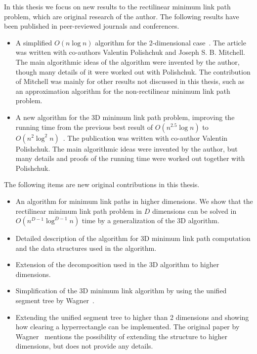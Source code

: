 \documentclass[english,gradu]{tktltiki2018}
\begin{document}
In this thesis we focus on new results to the rectilinear minimum link path problem, which are original research of the author.
The following results have been published in peer-reviewed journals and conferences.
\begin{itemize}
\item A simplified $O(n\log n)$ algorithm for the 2-dimensional case~\cite{revisited}.
The article was written with co-authors Valentin Polishchuk and Joseph S. B. Mitchell.
The main algorithmic ideas of the algorithm were invented by the author, though many details of it were worked out with Polishchuk.
The contribution of Mitchell was mainly for other results not discussed in this thesis, such as an approximation algorithm for the non-rectilinear minimum link path problem.
\item A new algorithm for the 3D minimum link path problem, improving the running time from the previous best result of $O(n^{2.5}\log n)$ to $O(n^2\log^2 n)$~\cite{restricted}.
The publication was written with co-author Valentin Polishchuk.
The main algorithmic ideas were invented by the author, but many details and proofs of the running time were worked out together with Polishchuk.
\end{itemize}

The following items are new original contributions in this thesis.

\begin{itemize}
\item An algorithm for minimum link paths in higher dimensions.
	We show that the rectilinear minimum link path problem in $D$ dimensions can be solved in $O(n^{D-1}\log^{D-1} n)$ time by a generalization of the 3D algorithm.
\item Detailed description of the algorithm for 3D minimum link path computation and the data structures used in the algorithm.
\item Extension of the decomposition used in the 3D algorithm to higher dimensions.
\item Simplification of the 3D minimum link algorithm by using the unified segment tree by Wagner~\cite{unified}.
\item Extending the unified segment tree to higher than 2 dimensions and showing how clearing a hyperrectangle can be implemented.
	The original paper by Wagner~\cite{unified} mentions the possibility of extending the structure to higher dimensions, but does not provide any details.
\end{itemize}
\end{document}
